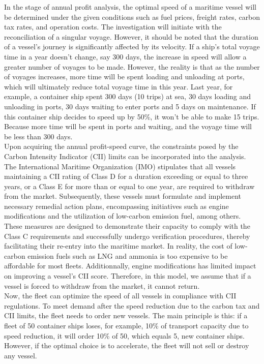 \documentclass[a4paper,12pt]{article}
\begin{document}
In the stage of annual profit analysis, the optimal speed of a maritime vessel will be determined under the given conditions such as fuel prices, freight rates, carbon tax rates, and operation costs.
The investigation will initiate with the reconciliation of a singular voyage.
However, it should be noted that the duration of a vessel's journey is significantly affected by its velocity.
If a ship's total voyage time in a year doesn't change, say 300 days, the increase in speed will allow a greater number of voyages to be made.
However, the reality is that as the number of voyages increases, more time will be spent loading and unloading at ports, which will ultimately reduce total voyage time in this year.
Last year, for example, a container ship spent 300 days (10 trips) at sea, 30 days loading and unloading in ports, 30 days waiting to enter ports and 5 days on maintenance.
If this container ship decides to speed up by 50\%, it won't be able to make 15 trips.
Because more time will be spent in ports and waiting, and the voyage time will be less than 300 days. \\

Upon acquiring the annual profit-speed curve, the constraints posed by the Carbon Intensity Indicator (CII) limits can be incorporated into the analysis.
The International Maritime Organization (IMO) stipulates that all vessels maintaining a CII rating of Class D for a duration exceeding or equal to three years, or a Class E for more than or equal to one year, are required to withdraw from the market.
Subsequently, these vessels must formulate and implement necessary remedial action plans, encompassing initiatives such as engine modifications and the utilization of low-carbon emission fuel, among others.
These measures are designed to demonstrate their capacity to comply with the Class C requirements and successfully undergo verification procedures, thereby facilitating their re-entry into the maritime market.
In reality, the cost of low-carbon emission fuels such as LNG and ammonia is too expensive to be affordable for most fleets.
Additionnally, engine modifications has limited impact on improving a vessel's CII score.
Therefore, in this model, we assume that if a vessel is forced to withdraw from the market, it cannot return.\\

Now, the fleet can optimize the speed of all vessels in compliance with CII regulations.
To meet demand after the speed reduction due to the carbon tax and CII limits, the fleet needs to order new vessels.
The main principle is this: if a fleet of 50 container ships loses, for example, 10\% of transport capacity due to speed reduction, it will order 10\% of 50, which equals 5, new container ships.
However, if the optimal choice is to accelerate, the fleet will not sell or destroy any vessel.\\
\end{document}
